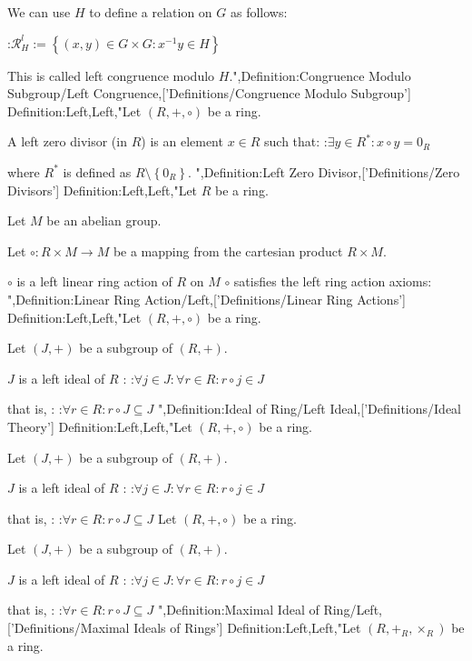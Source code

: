 We can use $H$ to define a relation on $G$ as follows:

:$\mathcal R^l_H := \left\lbrace \left( x, y \right) \in G \times G: x^{-1} y \in H \right\rbrace$

This is called left congruence modulo $H$.",Definition:Congruence Modulo Subgroup/Left Congruence,['Definitions/Congruence Modulo Subgroup']
Definition:Left,Left,"Let $\left( R, +, \circ \right)$ be a ring.


A left zero divisor (in $R$) is an element $x \in R$ such that:
:$\exists y \in R^*: x \circ y = 0_R$

where $R^*$ is defined as $R \setminus \left\lbrace 0_R \right\rbrace$.
",Definition:Left Zero Divisor,['Definitions/Zero Divisors']
Definition:Left,Left,"Let $R$ be a ring.

Let $M$ be an abelian group.

Let $\circ : R \times M \to M$ be a mapping from the cartesian product $R \times M$.


$\circ$ is a left linear ring action of $R$ on $M$  $\circ$ satisfies the left ring action axioms:
",Definition:Linear Ring Action/Left,['Definitions/Linear Ring Actions']
Definition:Left,Left,"Let $\left( R, +, \circ \right)$ be a ring.

Let $\left( J, + \right)$ be a subgroup of $\left( R, + \right)$.


$J$ is a left ideal of $R$ :
:$\forall j \in J: \forall r \in R: r \circ j \in J$

that is, :
:$\forall r \in R: r \circ J \subseteq J$
",Definition:Ideal of Ring/Left Ideal,['Definitions/Ideal Theory']
Definition:Left,Left,"Let $\left( R, +, \circ \right)$ be a ring.

Let $\left( J, + \right)$ be a subgroup of $\left( R, + \right)$.


$J$ is a left ideal of $R$ :
:$\forall j \in J: \forall r \in R: r \circ j \in J$

that is, :
:$\forall r \in R: r \circ J \subseteq J$
Let $\left( R, +, \circ \right)$ be a ring.

Let $\left( J, + \right)$ be a subgroup of $\left( R, + \right)$.


$J$ is a left ideal of $R$ :
:$\forall j \in J: \forall r \in R: r \circ j \in J$

that is, :
:$\forall r \in R: r \circ J \subseteq J$
",Definition:Maximal Ideal of Ring/Left,['Definitions/Maximal Ideals of Rings']
Definition:Left,Left,"Let $\left( R, +_R, \times_R \right)$ be a ring.

